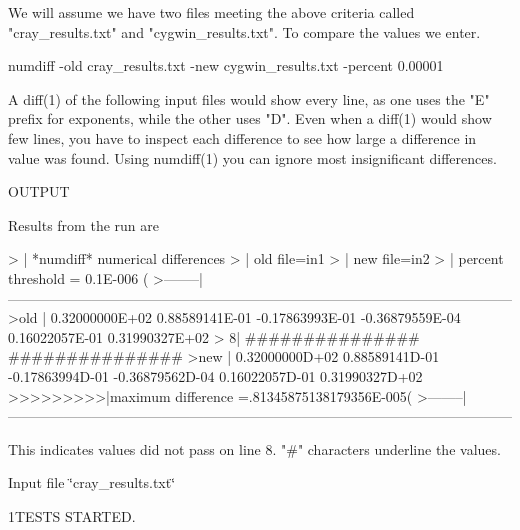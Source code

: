 \begin{DoxyVerb}We will assume we have two files meeting the above criteria called
"cray_results.txt" and "cygwin_results.txt". To compare the values
we enter.

  numdiff -old cray_results.txt -new cygwin_results.txt -percent 0.00001

A diff(1) of the following input files would show every line, as one
uses the "E" prefix for exponents, while the other uses "D". Even when a
diff(1) would show few lines, you have to inspect each difference to see
how large a difference in value was found. Using numdiff(1) you can
ignore most insignificant differences.

OUTPUT

Results from the run are

  >        | *numdiff* numerical differences
  >        | old file=in1
  >        | new file=in2
  >        | percent threshold =  0.1E-006 (%
  >--------|------------------------------------------------------------------------------------------------------------
  >old     |    0.32000000E+02    0.88589141E-01   -0.17863993E-01   -0.36879559E-04    0.16022057E-01    0.31990327E+02
  >       8|                                       ###############   ###############
  >new     |    0.32000000D+02    0.88589141D-01   -0.17863994D-01   -0.36879562D-04    0.16022057D-01    0.31990327D+02
  >>>>>>>>>|maximum difference =.81345875138179356E-005(%
  >--------|------------------------------------------------------------------------------------------------------------

This indicates values did not pass on line 8. "#" characters underline the values.
\end{DoxyVerb}


Input file \char`\"{}cray\+\_\+results.\+txt\char`\"{}

1\+T\+E\+S\+TS S\+T\+A\+R\+T\+ED.

